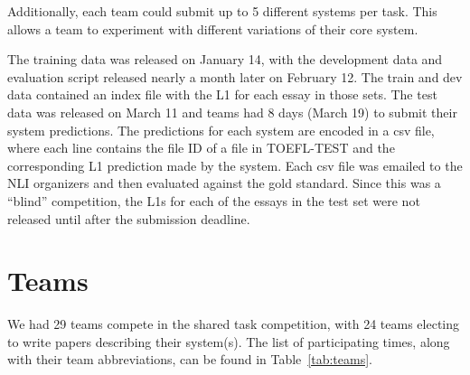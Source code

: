 \documentclass[11pt,letterpaper]{article}
\begin{document}
Additionally, each team could submit up to 5 different
systems per task.  This allows a team to experiment with different
variations of their core system.

The training data was released on January 14, with the development
data and evaluation script released nearly a month later on February 12.
The train and dev data contained an index file with the L1 for each
essay in those sets.  The test data was released on March 11 and teams had
8 days (March 19) to submit their system predictions.  The predictions for
each system
are encoded in a csv file, where each line contains the file ID of a
file in TOEFL-TEST and the corresponding L1 prediction made by the
system.  Each csv file was emailed to the NLI organizers and then
evaluated against the gold standard.  Since this was a ``blind''
competition, the L1s for each of the essays in the test set were not
released until after the submission deadline.


\section{Teams}

We had 29 teams compete in the shared task competition, with 24 teams
electing to write papers describing their system(s).  The list
of participating times, along with their team abbreviations, can be
found in Table~\ref{tab:teams}.
\end{document}
